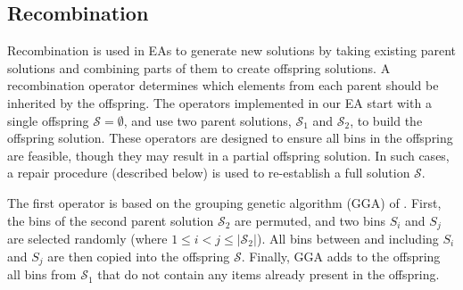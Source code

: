 \documentclass[a4paper,11pt,authoryear]{elsarticle}
\begin{document}

\subsection{Recombination}
\label{sub:recomb}
\noindent Recombination is used in EAs to generate new solutions by taking existing parent solutions and combining parts of them to create offspring solutions. A recombination operator determines which elements from each parent should be inherited by the offspring. The operators implemented in our EA start with a single offspring $\mathcal{S} = \emptyset$, and use two parent solutions, $\mathcal{S}_1$ and $\mathcal{S}_2$, to build the offspring solution. These operators are designed to ensure all bins in the offspring are feasible, though they may result in a partial offspring solution. In such cases, a repair procedure (described below) is used to re-establish a full solution $\mathcal{S}$.

The first operator is based on the grouping genetic algorithm (GGA) of \cite{falkenauer1992}. First, the bins of the second parent solution $\mathcal{S}_2$ are permuted, and two bins $S_i$ and $S_j$ are selected randomly (where $1 \leq i < j \leq |\mathcal{S}_2|$). All bins between and including $S_i$ and $S_j$ are then copied into the offspring $\mathcal{S}$. Finally, GGA adds to the offspring all bins from $\mathcal{S}_1$ that do not contain any items already present in the offspring.
\end{document}
